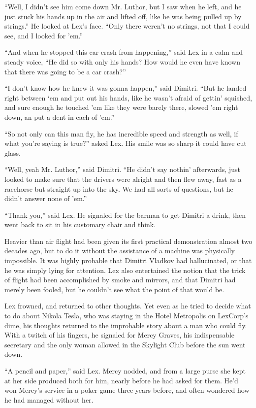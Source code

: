 \documentclass[ebook,12pt]{memoir}
\begin{document}
``Well, I didn't see him come down Mr. Luthor, but I saw when he left,
and he just stuck his hands up in the air and lifted off, like he was
being pulled up by strings.'' He looked at Lex's face. ``Only there
weren't no strings, not that I could see, and I looked for 'em.''

``And when he stopped this car crash from happening,'' said Lex in a
calm and steady voice, ``He did so with only his hands? How would he
even have known that there was going to be a car crash?''

``I don't know how he knew it was gonna happen,'' said Dimitri. ``But he
landed right between `em and put out his hands, like he wasn't afraid of
gettin' squished, and sure enough he touched 'em like they were barely
there, slowed 'em right down, an put a dent in each of 'em.''

``So not only can this man fly, he has incredible speed and strength as
well, if what you're saying is true?'' asked Lex. His smile was so sharp
it could have cut glass.

``Well, yeah Mr. Luthor,'' said Dimitri. ``He didn't say nothin'
afterwards, just looked to make sure that the drivers were alright and
then flew away, fast as a racehorse but straight up into the sky. We had
all sorts of questions, but he didn't answer none of 'em.''

``Thank you,'' said Lex. He signaled for the barman to get Dimitri a
drink, then went back to sit in his customary chair and think.

Heavier than air flight had been given its first practical demonstration
almost two decades ago, but to do it without the assistance of a machine
was physically impossible. It was highly probable that Dimitri Vladkov
had hallucinated, or that he was simply lying for attention. Lex also
entertained the notion that the trick of flight had been accomplished by
smoke and mirrors, and that Dimitri had merely been fooled, but he
couldn't see what the point of that would be.

Lex frowned, and returned to other thoughts. Yet even as he tried to
decide what to do about Nikola Tesla, who was staying in the Hotel
Metropolis on LexCorp's dime, his thoughts returned to the improbable
story about a man who could fly. With a twitch of his fingers, he
signaled for Mercy Graves, his indispensable secretary and the only
woman allowed in the Skylight Club before the sun went down.

``A pencil and paper,'' said Lex. Mercy nodded, and from a large purse
she kept at her side produced both for him, nearly before he had asked
for them. He'd won Mercy's service in a poker game three years before,
and often wondered how he had managed without her.
\end{document}

